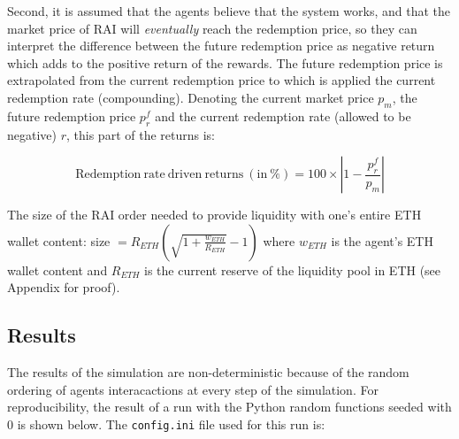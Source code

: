 \documentclass{article}
\begin{document}
    Second, it is assumed that the agents believe that the system works, and that the market price of RAI will \textit{eventually} reach the redemption price, so they can interpret the difference between the future redemption price as negative return which adds to the positive return of the rewards. The future redemption price is extrapolated from the current redemption price to which is applied the current redemption rate (compounding). Denoting the current market price $p_{m}$, the future redemption price $p^{f}_{r}$ and the current redemption rate (allowed to be negative) $r$, this part of the returns is:

    \begin{equation*}
      \mathrm{Redemption \ rate \ driven \ returns \ (in \ \%)} = 100 \times \left| 1 - \frac{p^{f}_{r}}{p_{m}} \right| 
    \end{equation*}

    The size of the RAI order needed to provide liquidity with one's entire ETH wallet content: size $ = R_{ETH}\left( \sqrt{1 + \frac{w_{ETH}}{R_{ETH}}} - 1 \right)$ where $w_{ETH}$ is the agent's ETH wallet content and $R_{ETH}$ is the current reserve of the liquidity pool in ETH (see Appendix for proof).

    \subsection{Results}

    The results of the simulation are non-deterministic because of the random ordering of agents interacactions at every step of the simulation. For reproducibility, the result of a run with the Python random functions seeded with 0 is shown below. The \texttt{config.ini} file used for this run is: 

    \newpage
\end{document}
